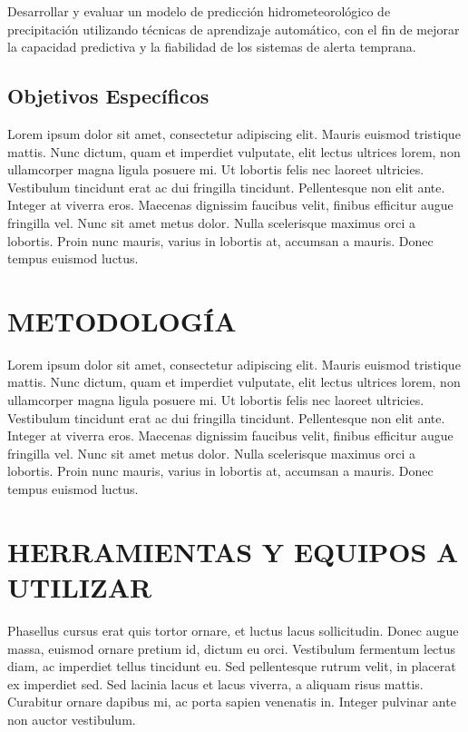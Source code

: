 \documentclass[stu, 12pt, helv, letterpaper, donotrepeattitle, floatsintext, natbib]{apa7}
\begin{document}
Desarrollar y evaluar un modelo de predicción hidrometeorológico de precipitación utilizando técnicas de aprendizaje automático, con el fin de mejorar la capacidad predictiva y la fiabilidad de los sistemas de alerta temprana.

\subsection*{Objetivos Específicos}

Lorem ipsum dolor sit amet, consectetur adipiscing elit. Mauris euismod tristique mattis. Nunc dictum, quam et imperdiet vulputate, elit lectus ultrices lorem, non ullamcorper magna ligula posuere mi. Ut lobortis felis nec laoreet ultricies. Vestibulum tincidunt erat ac dui fringilla tincidunt. Pellentesque non elit ante. Integer at viverra eros. Maecenas dignissim faucibus velit, finibus efficitur augue fringilla vel. Nunc sit amet metus dolor. Nulla scelerisque maximus orci a lobortis. Proin nunc mauris, varius in lobortis at, accumsan a mauris. Donec tempus euismod luctus.

\section*{METODOLOGÍA}

Lorem ipsum dolor sit amet, consectetur adipiscing elit. Mauris euismod tristique mattis. Nunc dictum, quam et imperdiet vulputate, elit lectus ultrices lorem, non ullamcorper magna ligula posuere mi. Ut lobortis felis nec laoreet ultricies. Vestibulum tincidunt erat ac dui fringilla tincidunt. Pellentesque non elit ante. Integer at viverra eros. Maecenas dignissim faucibus velit, finibus efficitur augue fringilla vel. Nunc sit amet metus dolor. Nulla scelerisque maximus orci a lobortis. Proin nunc mauris, varius in lobortis at, accumsan a mauris. Donec tempus euismod luctus.

\section*{HERRAMIENTAS Y EQUIPOS A UTILIZAR }

Phasellus cursus erat quis tortor ornare, et luctus lacus sollicitudin. Donec augue massa, euismod ornare pretium id, dictum eu orci. Vestibulum fermentum lectus diam, ac imperdiet tellus tincidunt eu. Sed pellentesque rutrum velit, in placerat ex imperdiet sed. Sed lacinia lacus et lacus viverra, a aliquam risus mattis. Curabitur ornare dapibus mi, ac porta sapien venenatis in. Integer pulvinar ante non auctor vestibulum.

\renewcommand\refname{\large\textbf{Referencias}}


\noindent {}\\
\end{document}
